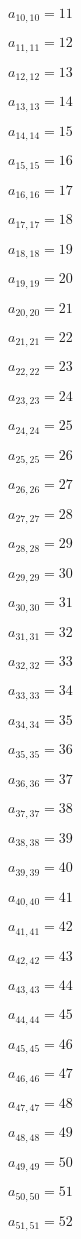 \documentclass[a4paper,12pt]{article}
\begin{document}
$a _{ 10, 10 } = 11$

$a _{ 11, 11 } = 12$

$a _{ 12, 12 } = 13$

$a _{ 13, 13 } = 14$

$a _{ 14, 14 } = 15$

$a _{ 15, 15 } = 16$

$a _{ 16, 16 } = 17$

$a _{ 17, 17 } = 18$

$a _{ 18, 18 } = 19$

$a _{ 19, 19 } = 20$

$a _{ 20, 20 } = 21$

$a _{ 21, 21 } = 22$

$a _{ 22, 22 } = 23$

$a _{ 23, 23 } = 24$

$a _{ 24, 24 } = 25$

$a _{ 25, 25 } = 26$

$a _{ 26, 26 } = 27$

$a _{ 27, 27 } = 28$

$a _{ 28, 28 } = 29$

$a _{ 29, 29 } = 30$

$a _{ 30, 30 } = 31$

$a _{ 31, 31 } = 32$

$a _{ 32, 32 } = 33$

$a _{ 33, 33 } = 34$

$a _{ 34, 34 } = 35$

$a _{ 35, 35 } = 36$

$a _{ 36, 36 } = 37$

$a _{ 37, 37 } = 38$

$a _{ 38, 38 } = 39$

$a _{ 39, 39 } = 40$

$a _{ 40, 40 } = 41$

$a _{ 41, 41 } = 42$

$a _{ 42, 42 } = 43$

$a _{ 43, 43 } = 44$

$a _{ 44, 44 } = 45$

$a _{ 45, 45 } = 46$

$a _{ 46, 46 } = 47$

$a _{ 47, 47 } = 48$

$a _{ 48, 48 } = 49$

$a _{ 49, 49 } = 50$

$a _{ 50, 50 } = 51$

$a _{ 51, 51 } = 52$
\end{document}
